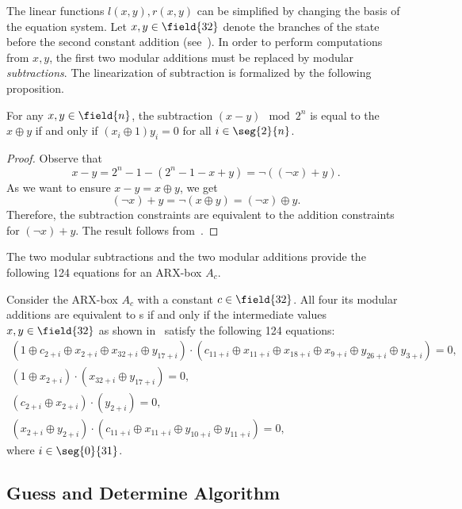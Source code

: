 The linear functions $l(x,y),r(x,y)$ can be simplified by changing the basis of the equation system. Let $x, y \in \field{32}$ denote the branches of the state before the second constant addition (see~). In order to perform computations from $x,y$, the first two modular additions must be replaced by modular \emph{subtractions}. The linearization of subtraction is formalized by the following proposition.


\begin{proposition}
For any $x, y \in \field{n}$, the subtraction $(x-y)\mod{2^n}$ is equal to the \txor{} $x\oplus y$ if and only if $(x_i \oplus 1) y_i = 0$ for all $i \in \seg{2}{n}$.
\end{proposition}
\begin{proof}
Observe that
$$
x-y = 2^n-1 - (2^n-1 - x+y) = \lnot( (\lnot x) + y).
$$
As we want to ensure $x-y = x\oplus y$, we get
$$
(\lnot x) + y = \lnot (x\oplus y) = (\lnot x) \oplus y.
$$
Therefore, the subtraction constraints are equivalent to the addition constraints for $(\lnot x) + y$. The result follows from~.
\end{proof}

The two modular subtractions and the two modular additions provide the following 124 equations for an ARX-box $A_c$.

\begin{proposition}
Consider the ARX-box $A_c$ with a constant $c \in \field{32}$. All four its modular additions are equivalent to \txor{}s if and only if the intermediate values $x,y\in \field{32}$ as shown in~ satisfy the following 124 equations:
\begin{align*}
(1 \oplus c_{2+i} \oplus x_{2+i} \oplus x_{32+i} \oplus y_{17+i}) \cdot (c_{11+i} \oplus x_{11+i} \oplus x_{18+i} \oplus x_{9+i} \oplus y_{26+i} \oplus y_{3+i}) = 0, \\
(1 \oplus x_{2+i}) \cdot (x_{32+i} \oplus y_{17+i}) = 0, \\
(c_{2+i} \oplus x_{2+i}) \cdot (y_{2+i}) = 0, \\
(x_{2+i} \oplus y_{2+i}) \cdot (c_{11+i} \oplus x_{11+i} \oplus y_{10+i} \oplus y_{11+i}) = 0,
\end{align*}
where $i \in \seg{0}{31}$.
\end{proposition}


\subsection{Guess and Determine Algorithm}

